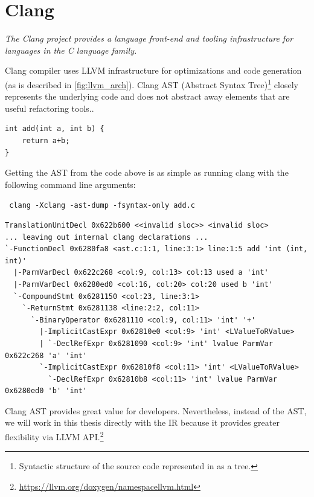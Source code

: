 \documentclass[12pt, twoside]{fithesis2}
\renewcommand{\_}{\leavevmode \kern0.07em\vbox{\hrule width0.4em}}
\begin{document}
\section{Clang}
\label{sec:llvm-clang}

\emph{The Clang project provides a language front-end and tooling
infrastructure for languages in the C language family.}\cite{clang}

Clang compiler uses LLVM infrastructure for optimizations and code generation
(as is described in \autoref{fig:llvm_arch}).
Clang AST (Abstract Syntax Tree)\footnote{
Syntactic structure of the source code represented in as a tree.
} closely represents the underlying code and does not abstract away elements
that are useful refactoring tools.\cite{clang-ast}.

\begin{verbatim}
int add(int a, int b) {
    return a+b;
}
\end{verbatim}

Getting the AST from the code above is as simple as running clang with the
following command line arguments:

\texttt{
clang -Xclang -ast-dump -fsyntax-only add.c
}

\begin{verbatim}
TranslationUnitDecl 0x622b600 <<invalid sloc>> <invalid sloc>
... leaving out internal clang declarations ...
`-FunctionDecl 0x6280fa8 <ast.c:1:1, line:3:1> line:1:5 add 'int (int, int)'
  |-ParmVarDecl 0x622c268 <col:9, col:13> col:13 used a 'int'
  |-ParmVarDecl 0x6280ed0 <col:16, col:20> col:20 used b 'int'
  `-CompoundStmt 0x6281150 <col:23, line:3:1>
    `-ReturnStmt 0x6281138 <line:2:2, col:11>
      `-BinaryOperator 0x6281110 <col:9, col:11> 'int' '+'
        |-ImplicitCastExpr 0x62810e0 <col:9> 'int' <LValueToRValue>
        | `-DeclRefExpr 0x6281090 <col:9> 'int' lvalue ParmVar 0x622c268 'a' 'int'
        `-ImplicitCastExpr 0x62810f8 <col:11> 'int' <LValueToRValue>
          `-DeclRefExpr 0x62810b8 <col:11> 'int' lvalue ParmVar 0x6280ed0 'b' 'int'
\end{verbatim}

Clang AST provides great value for developers. Nevertheless, instead of the
AST, we will work in this thesis directly with the IR because it provides
greater flexibility via LLVM API.\footnote{
\url{https://llvm.org/doxygen/namespacellvm.html}
}
\end{document}
